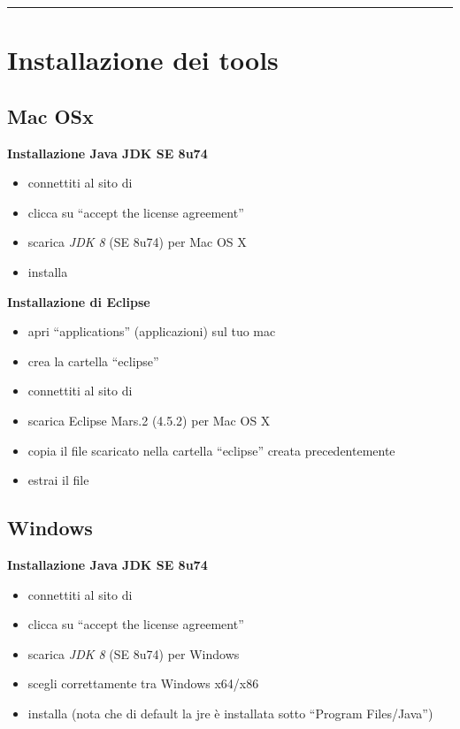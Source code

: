 \documentclass{article}
\begin{document}
\hrule
\section{Installazione dei tools}
\subsection{Mac OSx}
\textbf{Installazione Java JDK SE 8u74}
\begin{itemize}
\item connettiti al sito di
  \href{http://www.oracle.com/technetwork/java/javase/downloads/jdk8-downloads-2133151.html}{}
\item clicca su ``accept the license agreement''
\item scarica \textit{JDK 8} (SE 8u74) per Mac OS X
\item installa
\end{itemize}

\textbf{Installazione di Eclipse}
\begin{itemize}
\item apri ``applications'' (applicazioni) sul tuo mac
\item crea la cartella ``eclipse''
\item connettiti al sito di \href{https://eclipse.org/downloads/}{}
\item scarica Eclipse Mars.2 (4.5.2) per Mac OS X
\item copia il file scaricato nella cartella ``eclipse'' creata precedentemente
\item estrai il file
\end{itemize}


\subsection{Windows}
\textbf{Installazione Java JDK SE 8u74}
\begin{itemize}
\item connettiti al sito di
  \href{http://www.oracle.com/technetwork/java/javase/downloads/jdk8-downloads-2133151.html}{}
\item clicca su ``accept the license agreement''
\item scarica \textit{JDK 8} (SE 8u74) per Windows
\item scegli correttamente tra Windows x64/x86
\item installa (nota che di default la jre \`e installata sotto ``Program Files/Java'')
\end{itemize}
\end{document}
